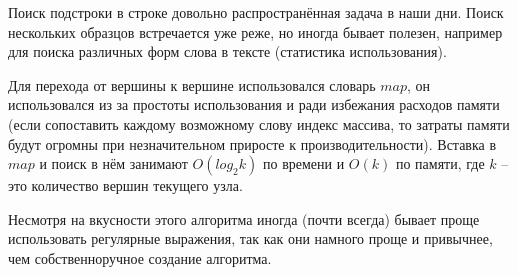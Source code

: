 \documentclass[12pt]{article}
\begin{document}
Поиск подстроки в строке довольно распространённая задача в наши дни. Поиск нескольких образцов встречается уже реже, но иногда бывает полезен, например для поиска различных форм слова в тексте (статистика использования). 

Для перехода от вершины к вершине использовался словарь  $map$, он использовался из за простоты использования и ради избежания расходов памяти (если сопоставить каждому возможному слову индекс массива, то затраты памяти будут огромны при незначительном приросте к производительности). Вставка в $map$ и поиск в нём занимают $O(log _2 k)$ по времени и $O(k)$ по памяти, где $k$ -- это количество вершин текущего узла.

Несмотря на вкусности этого алгоритма иногда (почти всегда) бывает проще использовать регулярные выражения, так как они намного проще и привычнее, чем собственноручное создание алгоритма. 
\end{document}
